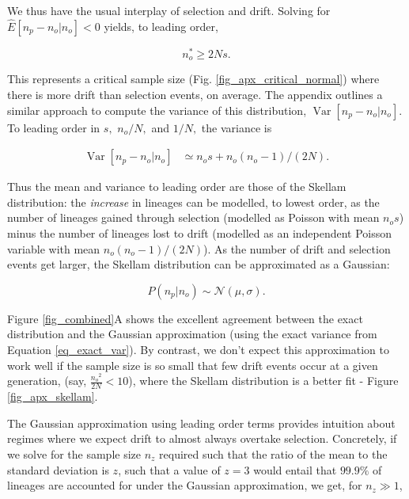 \documentclass[review]{elsarticle}
\begin{document}
We thus have the usual interplay of selection and drift. Solving for $ \hat{E}[n_p -n_o | n_o]<0$
yields, to leading order,

\begin{equation}
  \label{eq_critical_sample}
  n_o^* \ge 2N s.
\end{equation}

This represents a critical sample size (Fig.
\ref{fig_apx_critical_normal}) where there is more drift than selection events, on average. 
The appendix outlines a similar approach to compute the variance of this distribution, $\operatorname{Var}[n_p-n_o | n_o].$ 
To leading order in $s,$ $n_o/N,$ and $1/N,$ the variance is 

\begin{equation}
  \begin{aligned}
    \operatorname{Var}[n_p-n_o | n_o] &\simeq
   n_o  s +   n_o (n_o-1)/(2 N).
    \label{eq_gauss_var}
  \end{aligned}
\end{equation}

Thus the mean and variance to leading order are those of the Skellam distribution: the
\textit{increase} in lineages can be modelled, to lowest order, as the number of lineages gained
through selection (modelled as Poisson with mean  $ n_o s$) minus the number of lineages lost to
drift (modelled as an independent Poisson variable with mean  $ n_o (n_o-1)/(2 N)$).
As the number of drift and selection events get larger, the Skellam distribution can be approximated as a
Gaussian:

\begin{equation}
  P(n_p|n_o) \sim \mathcal{N}(\mu, \sigma).
  \label{eq_gaussian}
\end{equation}

Figure \ref{fig_combined}A shows the excellent agreement between the exact distribution and the
Gaussian approximation (using the exact variance from Equation \ref{eq_exact_var}). By contrast,
we don't expect this approximation to work well if the sample size is so small that few drift
events occur at a given generation, (say, $\frac{{n_o}^2}{2N} < 10$), where the Skellam
distribution is a better fit - Figure \ref{fig_apx_skellam}.
 
The Gaussian approximation using leading order terms provides intuition about regimes where we
expect drift to almost always overtake selection.  Concretely, if we solve for the sample size
$n_z$ required such that the ratio of the mean to the standard deviation is $z$, such that a value
of $z=3$ would entail that $99.9\%$ of lineages are accounted for under the Gaussian approximation,
we get, for $n_z\gg 1$,
\end{document}
